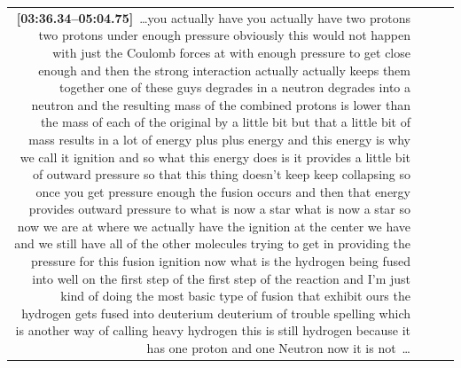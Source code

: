 \documentclass[10pt]{article}
\begin{document}
\begin{tiny}
\begin{longtable}{r p{0.3in} p{1.212in} p{3.8in}}
                                                                                                                                                                                                                                                                                                                                                                                                                                                                                         \textbf{[03:36.34--05:04.75]}~\ldots you actually have you actually have two protons two protons under enough pressure obviously this would not happen with just the Coulomb forces at with enough pressure to get close enough and then the strong interaction actually actually keeps them together one of these guys degrades in a neutron degrades into a neutron and the resulting mass of the combined protons is lower than the mass of each of the original by a little bit but that a little bit of mass results in a lot of energy plus plus energy and this energy is why we call it ignition and so what this energy does is it provides a little bit of outward pressure so that this thing doesn't keep keep collapsing so once you get pressure enough the fusion occurs and then that energy provides outward pressure to what is now a star what is now a star so now we are at where we actually have the ignition at the center we have and we still have all of the other molecules trying to get in providing the pressure for this fusion ignition now what is the hydrogen being fused into well on the first step of the first step of the reaction and I'm just kind of doing the most basic type of fusion that exhibit ours the hydrogen gets fused into deuterium deuterium of trouble spelling which is another way of calling heavy hydrogen this is still hydrogen because it has one proton and one Neutron now it is not~\ldots \\

\end{longtable}
\end{tiny}
\end{document}
